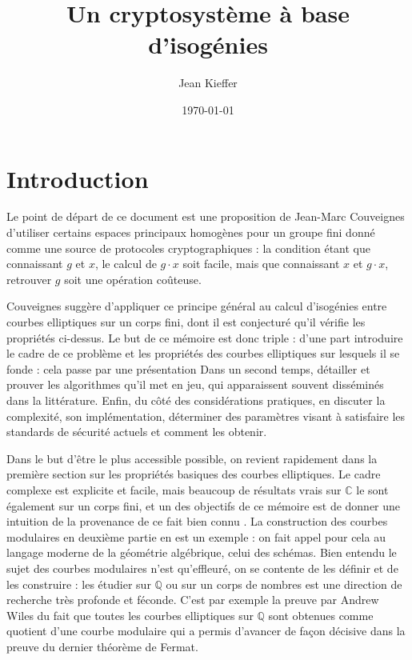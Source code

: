 \documentclass[11pt,a4paper]{article}
\title{Un cryptosystème à base d'isogénies}
\author{Jean Kieffer}
\date{\today}
\newcommand{\C}{\mathbb{C}}
\newcommand{\Q}{\mathbb{Q}}
\theoremstyle{definition}
\begin{document}
\maketitle
\newpage

\section{Introduction}

Le point de départ de ce document est une proposition de Jean-Marc Couveignes \cite{Couv} d'utiliser certains espaces principaux homogènes pour un groupe fini donné comme une source de protocoles cryptographiques : la condition étant que connaissant $g$ et $x$, le calcul de $g\cdot x$ soit facile, mais que connaissant $x$ et $g\cdot x$, retrouver $g$ soit une opération coûteuse.

Couveignes suggère d'appliquer ce principe général au calcul d'isogénies entre courbes elliptiques sur un corps fini, dont il est conjecturé qu'il vérifie les propriétés ci-dessus. Le but de ce mémoire est donc triple : d'une part introduire le cadre de ce problème et les propriétés des courbes elliptiques sur lesquels il se fonde : cela passe par une présentation  Dans un second temps, détailler et prouver les algorithmes qu'il met en jeu, qui apparaissent souvent disséminés dans la littérature. Enfin, du côté des considérations pratiques, en discuter la complexité, son implémentation, déterminer des paramètres visant à satisfaire les standards de sécurité actuels et comment les obtenir.

Dans le but d'être le plus accessible possible, on revient rapidement dans la première section sur les propriétés basiques des courbes elliptiques. Le cadre complexe est explicite et facile, mais beaucoup de résultats vrais sur $\C$ le sont également sur un corps fini, et un des objectifs de ce mémoire est de donner une intuition de la provenance de ce fait \og bien connu \fg. La construction des courbes modulaires en deuxième partie en est un exemple : on fait appel pour cela au langage moderne de la géométrie algébrique, celui des schémas. Bien entendu le sujet des courbes modulaires n'est qu'effleuré, on se contente de les définir et de les construire : les étudier sur $\Q$ ou sur un corps de nombres est une direction de recherche très profonde et féconde. C'est par exemple la preuve par Andrew Wiles du fait que toutes les courbes elliptiques sur $\Q$ sont obtenues comme quotient d'une courbe modulaire qui a permis d'avancer de façon décisive dans la preuve du dernier théorème de Fermat.
\end{document}
